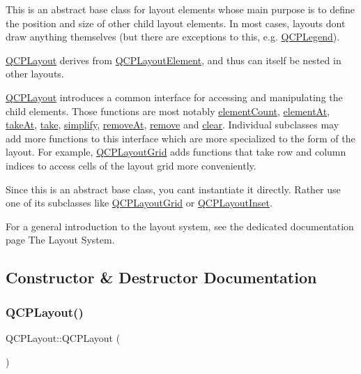 This is an abstract base class for layout elements whose main purpose is to define the position and size of other child layout elements. In most cases, layouts don\textquotesingle{}t draw anything themselves (but there are exceptions to this, e.\+g. \hyperlink{class_q_c_p_legend}{Q\+C\+P\+Legend}).

\hyperlink{class_q_c_p_layout}{Q\+C\+P\+Layout} derives from \hyperlink{class_q_c_p_layout_element}{Q\+C\+P\+Layout\+Element}, and thus can itself be nested in other layouts.

\hyperlink{class_q_c_p_layout}{Q\+C\+P\+Layout} introduces a common interface for accessing and manipulating the child elements. Those functions are most notably \hyperlink{class_q_c_p_layout_a39d3e9ef5d9b82ab1885ba1cb9597e56}{element\+Count}, \hyperlink{class_q_c_p_layout_afa73ca7d859f8a3ee5c73c9b353d2a56}{element\+At}, \hyperlink{class_q_c_p_layout_a5a79621fa0a6eabb8b520cfc04fb601a}{take\+At}, \hyperlink{class_q_c_p_layout_ada26cd17e56472b0b4d7fbbc96873e4c}{take}, \hyperlink{class_q_c_p_layout_a41e6ac049143866e8f8b4964efab01b2}{simplify}, \hyperlink{class_q_c_p_layout_a2403f684fee3ce47132faaeed00bb066}{remove\+At}, \hyperlink{class_q_c_p_layout_a6c58f537d8086f352576ab7c5b15d0bc}{remove} and \hyperlink{class_q_c_p_layout_a02883bdf2769b5b227f0232dba1ac4ee}{clear}. Individual subclasses may add more functions to this interface which are more specialized to the form of the layout. For example, \hyperlink{class_q_c_p_layout_grid}{Q\+C\+P\+Layout\+Grid} adds functions that take row and column indices to access cells of the layout grid more conveniently.

Since this is an abstract base class, you can\textquotesingle{}t instantiate it directly. Rather use one of its subclasses like \hyperlink{class_q_c_p_layout_grid}{Q\+C\+P\+Layout\+Grid} or \hyperlink{class_q_c_p_layout_inset}{Q\+C\+P\+Layout\+Inset}.

For a general introduction to the layout system, see the dedicated documentation page The Layout System. 

\subsection{Constructor \& Destructor Documentation}
\hypertarget{class_q_c_p_layout_a04222e6e1361fd802d48f1a25b7020d4}{}\label{class_q_c_p_layout_a04222e6e1361fd802d48f1a25b7020d4} 
\subsubsection{\texorpdfstring{Q\+C\+P\+Layout()}{QCPLayout()}}
{\footnotesize\ttfamily Q\+C\+P\+Layout\+::\+Q\+C\+P\+Layout (\begin{DoxyParamCaption}{ }\end{DoxyParamCaption})\hspace{0.3cm}{\ttfamily [explicit]}}

